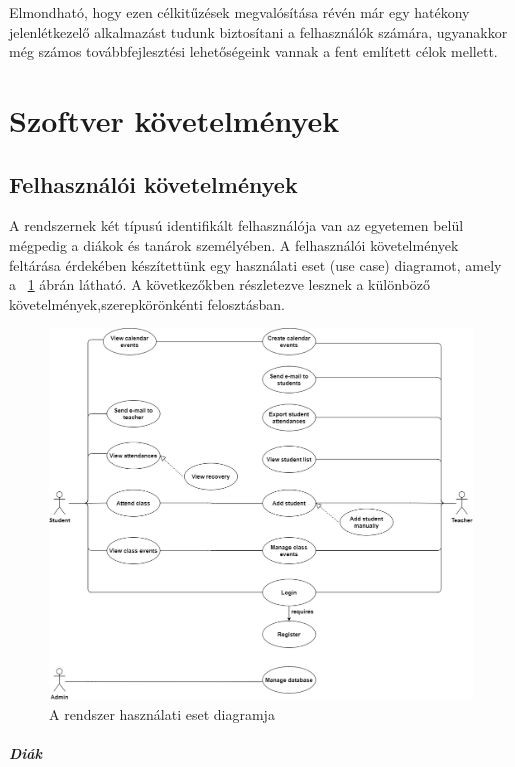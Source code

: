 \documentclass[12pt]{article}
\numberwithin{figure}{section}
\numberwithin{equation}{section}
\begin{document}
Elmondható, hogy ezen célkitűzések megvalósítása révén már egy hatékony jelenlétkezelő alkalmazást tudunk biztosítani a felhasználók számára, ugyanakkor még számos továbbfejlesztési lehetőségeink vannak a fent említett célok mellett.


\section{Szoftver követelmények}
\subsection{Felhasználói követelmények}

A rendszernek két típusú identifikált felhasználója van az egyetemen belül mégpedig a diákok és tanárok személyében. A felhasználói követelmények feltárása érdekében készítettünk egy használati eset (use case) diagramot, amely a ~\ref{fig:usecase} ábrán látható. A következőkben részletezve lesznek a különböző követelmények,szerepkörönkénti felosztásban.

\newpage

\begin{figure}[H]
	\includegraphics[width=\textwidth]{UseCase.png}
	\caption{A rendszer használati eset diagramja}
	\label{fig:usecase}
\end{figure}

\hfill\break

\subparagraph*{Diák}
\end{document}
